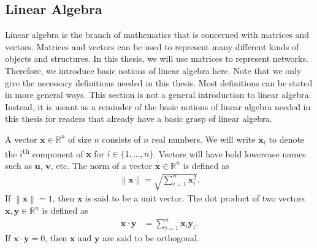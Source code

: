 \documentclass[11pt,a4paper]{book}
\begin{document}
\subsection{Linear Algebra}
Linear algebra is the branch of mathematics that is concerned with
matrices and vectors.  Matrices and vectors can be used to represent
many different kinds of objects and structures.  In this thesis, we will
use matrices to represent networks.  Therefore, we introduce basic
notions of linear algebra here.  Note that we only give the necessary
definitions needed in this thesis.  Most definitions can be stated in
more general ways. 
This section is not a general introduction to linear algebra.  Instead,
it is meant as a reminder of the basic notions of linear algebra needed
in this thesis for 
readers that already have a basic grasp of linear algebra.  

A vector $\mathbf x \in \mathbb R^n$ of size $n$ consists of $n$ real numbers.  We will
write $\mathbf x_i$ to denote the $i$\textsuperscript{th} component of
$\mathbf x$ for $i \in \{1, \ldots, n\}$.  
Vectors will have bold lowercase names such as $\mathbf u$, $\mathbf v$,
etc. 
The norm of a vector $\mathbf x \in \mathbb R^n$ is defined as 
\begin{align}
\left\| \mathbf x \right \| = \sqrt{\sum_{i=1}^n \mathbf x_i^2}. 
\end{align}
If $\left\| \mathbf x \right \| = 1$, then $\mathbf x$
is said to be a unit vector. 
The dot product of two vectors $\mathbf x, \mathbf y \in \mathbb R^n$ is
defined as 
\begin{align}
\mathbf x \cdot \mathbf y &=
\sum_{i=1}^n \mathbf x_i \mathbf y_i. 
\end{align}
If $\mathbf x \cdot \mathbf y =
0$, then $\mathbf x$ and $\mathbf y$ are said to be orthogonal. 
\end{document}
